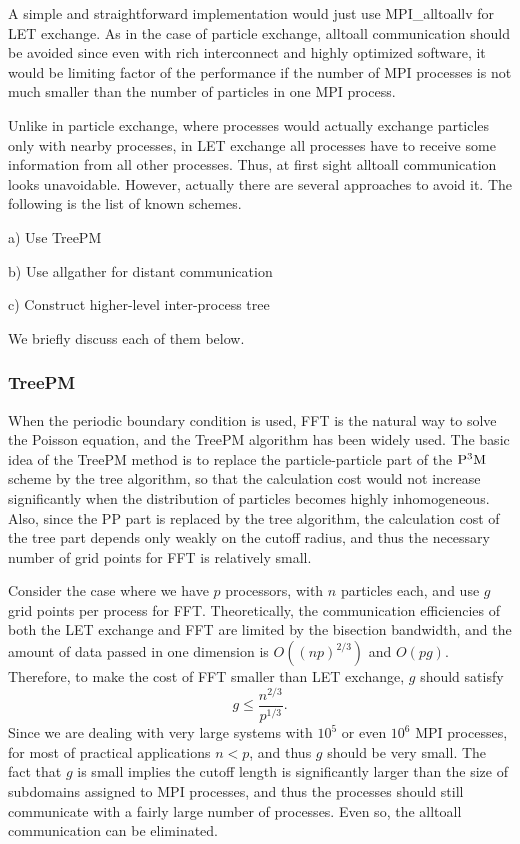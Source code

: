 A simple and straightforward implementation would just use
MPI\_alltoallv for LET exchange. As in the case of particle exchange,
alltoall communication should be avoided since even with rich
interconnect and highly optimized software, it would be limiting factor
of the performance if the number of MPI processes is not much smaller
than the number of particles in one MPI process.

Unlike in  particle exchange, where processes would actually
exchange particles only with nearby processes, in LET exchange all
processes have to receive some information from all other processes. Thus,
at first sight alltoall communication looks unavoidable. However,
actually there are several approaches to avoid it. The following is
the list of known schemes. 

\begin{description}
\item{a)} Use TreePM 
\item{b)} Use allgather for distant communication
\item{c)} Construct higher-level inter-process tree
 \end{description}

We briefly discuss each of them below.


\subsubsection{TreePM }

When the periodic boundary condition is used, FFT is the natural way
to solve the Poisson equation, and the TreePM
algorithm\cite{Bagla2003} has been widely used. The basic idea of
the TreePM method is to replace the particle-particle part of the $\rm
P^3M$ scheme\cite{Eastwoodetal1984} by the tree algorithm, so that the
calculation cost would not increase significantly when the
distribution of particles becomes highly inhomogeneous. Also, since
the PP part is replaced by the tree algorithm, the calculation cost of
the tree part depends only weakly on the cutoff radius, and thus the
necessary number of grid points for FFT is relatively small. 

Consider the case where we have $p$ processors, with $n$ particles
each, and use $g$  grid points per process for FFT. Theoretically, the
communication efficiencies of both the LET exchange and FFT are
limited by the bisection bandwidth, and the amount of data passed in
one dimension is $O((np)^{2/3})$ and $O(pg)$. Therefore,
to make the cost of FFT smaller than LET exchange,  $g$ should satisfy
\begin{equation}
  g \le \frac{n^{2/3}}{p^{1/3}}.
  \end{equation}
Since we are dealing with very large systems with $10^5$ or even
$10^6$ MPI processes, for most of practical applications $n<p$, and
thus $g$ should be very small. The fact that $g$ is small implies the
cutoff length is significantly larger than the size of subdomains
assigned to MPI processes, and thus the processes should still
communicate with a fairly large number of processes. Even so, the
alltoall communication can be eliminated.


